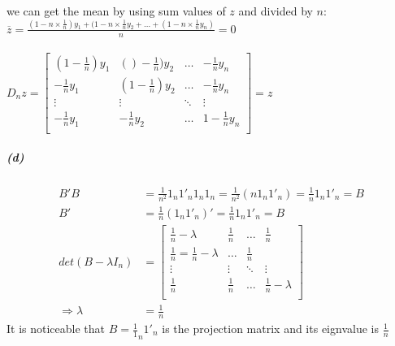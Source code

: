 \documentclass[11pt]{article}
\begin{document}
    we can get the mean by using sum values of $z$ and divided by $n$:
    \\
    $\overline{z} = \frac{(1-n \times \frac{1}{n}) y_1 + (1-n \times \frac{1}{n} y_2 + \dots + (1-n \times \frac{1}{n} y_n )}{n} = 0$
    \\
    \\
    $D_nz =
    \begin{bmatrix}
      (1-\frac{1}{n})y_1 & ()-\frac{1}{n})y_2 & \dots & -\frac{1}{n}y_n \\
      -\frac{1}{n}y_1 & (1-\frac{1}{n})y_2 & \dots & -\frac{1}{n}y_n  \\
      \vdots & \vdots & \ddots & \vdots \\
      -\frac{1}{n}y_1 & -\frac{1}{n}y_2 &\dots & 1-\frac{1}{n}y_n  \\
    \end{bmatrix}
    = z $
  \subparagraph{(d)}
    \begin{align*}
        B'B &= \frac{1}{n^2} 1_n 1'_n1_n1_n = \frac{1}{n^2}(n1_n1'_n) = \frac{1}{n}1_n1'_n = B \\
        B' &= \frac{1}{n} (1_n1'_n)' = \frac{1}{n} 1_n1'_n = B \\
        det(B - \lambda I_n) &=
        \begin{bmatrix}
          \frac{1}{n} - \lambda & \frac{1}{n} & \dots & \frac{1}{n} \\
          \frac{1}{n} = \frac{1}{n} - \lambda & \dots & \frac{1}{n} \\
          \vdots & \vdots & \ddots & \vdots \\
          \frac{1}{n} & \frac{1}{n} & \dots & \frac{1}{n} - \lambda \\
        \end{bmatrix} \\
        \Rightarrow \lambda &= \frac{1}{n}
    \end{align*}
    It is noticeable that $B = \frac{1}1_n1'_n$ is the projection matrix and
    its eignvalue is $\frac{1}{n}$
\end{document}
